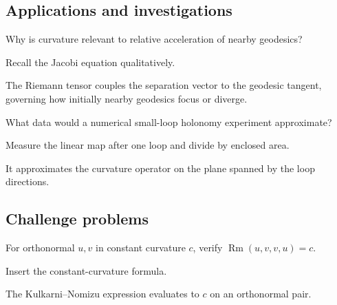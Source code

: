 \subsection*{Applications and investigations}

\begin{exercise}\label{exr:vii26-ped-13}
Why is curvature relevant to relative acceleration of nearby geodesics?
\end{exercise}

\begin{hint}
Recall the Jacobi equation qualitatively.
\end{hint}

\begin{solution}
The Riemann tensor couples the separation vector to the geodesic tangent, governing how initially nearby geodesics focus or diverge.
\end{solution}

\begin{exercise}\label{exr:vii26-ped-14}
What data would a numerical small-loop holonomy experiment approximate?
\end{exercise}

\begin{hint}
Measure the linear map after one loop and divide by enclosed area.
\end{hint}

\begin{solution}
It approximates the curvature operator on the plane spanned by the loop directions.
\end{solution}

\subsection*{Challenge problems}

\begin{exercise}\label{exr:vii26-ped-15}
For orthonormal \(u,v\) in constant curvature \(c\), verify \(\operatorname{Rm}(u,v,v,u)=c\).
\end{exercise}

\begin{hint}
Insert the constant-curvature formula.
\end{hint}

\begin{solution}
The Kulkarni--Nomizu expression evaluates to \(c\) on an orthonormal pair.
\end{solution}

